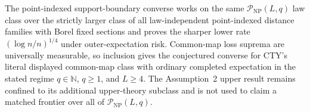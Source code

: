 The point-indexed support-boundary converse works on the same \(\mathcal P_{\mathrm{NP}}(L,q)\) law class over the strictly larger class of all law-independent point-indexed distance families with Borel fixed sections and proves the sharper lower rate \((\log n/n)^{1/4}\) under outer-expectation risk.  Common-map loss suprema are universally measurable, so inclusion gives the conjectured converse for CTY's literal displayed common-map class with ordinary completed expectation in the stated regime \(q\in\mathbb N\), \(q\geq1\), and \(L\geq4\).  The Assumption~2 upper result remains confined to its additional upper-theory subclass and is not used to claim a matched frontier over all of \(\mathcal P_{\mathrm{NP}}(L,q)\).